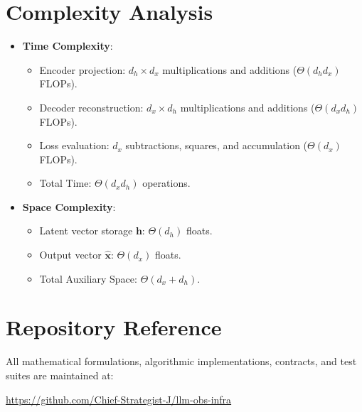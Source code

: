 \documentclass[11pt,a4paper]{article}
\theoremstyle{definition}
\begin{document}
\section{Complexity Analysis}
\begin{itemize}
    \item \textbf{Time Complexity}:
    \begin{itemize}
        \item Encoder projection: $d_h \times d_x$ multiplications and additions ($\Theta(d_h d_x)$ FLOPs).
        \item Decoder reconstruction: $d_x \times d_h$ multiplications and additions ($\Theta(d_x d_h)$ FLOPs).
        \item Loss evaluation: $d_x$ subtractions, squares, and accumulation ($\Theta(d_x)$ FLOPs).
        \item Total Time: $\Theta(d_x d_h)$ operations.
    \end{itemize}
    \item \textbf{Space Complexity}:
    \begin{itemize}
        \item Latent vector storage $\mathbf{h}$: $\Theta(d_h)$ floats.
        \item Output vector $\hat{\mathbf{x}}$: $\Theta(d_x)$ floats.
        \item Total Auxiliary Space: $\Theta(d_x + d_h)$.
    \end{itemize}
\end{itemize}

\section{Repository Reference}
All mathematical formulations, algorithmic implementations, contracts, and test suites are maintained at:
\begin{center}
\url{https://github.com/Chief-Strategist-J/llm-obs-infra}
\end{center}
\end{document}
